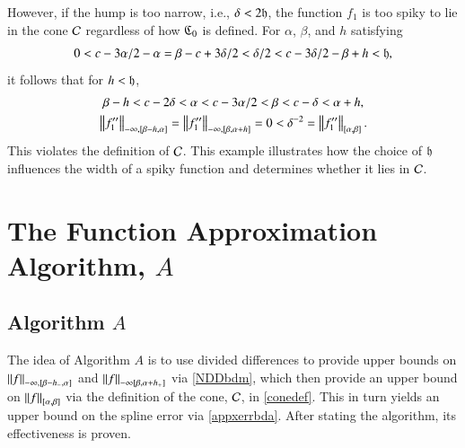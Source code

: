 \documentclass[review]{elsarticle}
\theoremstyle{definition}
\begin{document}
However, if the hump is too narrow, i.e., $\delta < 2 \fh$, the function $f_1$
is too spiky to lie in the cone $\cc$ regardless of how $\fC_0$ is defined. For
$\alpha$, $\beta$, and $h$ satisfying
\[
0 < c - 3\alpha/2 -\alpha =  \beta - c+ 3\delta/2 < \delta/2 < c-3\delta/2 - \beta + h < \fh,
\]
it follows that for $h < \fh$,
\begin{gather*}
   \beta -  h < c - 2 \delta < \alpha < c - 3\alpha/2 < \beta < c - \delta < \alpha + h, 
\\ \norm[-\infty,{[\beta - h,\alpha]}]{f''_1} =\norm[-\infty,{[\beta,\alpha+h]}]{f''_1}=0 < \delta^{-2} =\norm[{[\alpha,\beta]}]{f''_1}.
\end{gather*}
This violates the definition of $\cc$. This example illustrates how the choice
of $\fh$ influences the width of a spiky function and determines whether it lies in
$\cc$.


\section{The Function Approximation Algorithm, $A$}\label{sec:fappx}

\subsection{Algorithm $A$} \label{subsec:appxalgo}

The idea of Algorithm $A$ is to use divided differences to provide upper bounds
on $\norm[-\infty,{[\beta - h_-, \alpha]}]{f}$ and $\norm[-\infty{[\beta,
\alpha+h_+]}]{f}$ via \eqref{NDDbdm}, which then provide an upper bound on
$\norm[{[\alpha,\beta]}]{f}$ via the definition of the cone, $\cc$, in
\eqref{conedef}. This in turn yields an upper bound on the spline error via
\eqref{appxerrbda}. After stating the algorithm, its effectiveness is proven.
\end{document}
